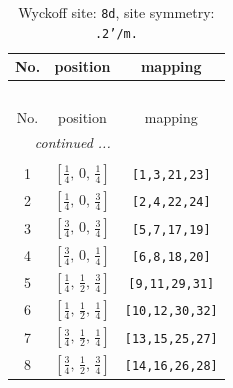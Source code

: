 \documentclass[fleqn,8pt]{jsarticle}
\begin{document}
\begin{longtable}{ccc}
\caption{Wyckoff site: {\tt 8d}, site symmetry: {\tt .2'/m.}}
 \\
 \hline \hline
No. & position & mapping \\ \hline \endfirsthead

\multicolumn{2}{l}{\tablename\ \thetable{}} \\
 \hline \hline
No. & position & mapping \\ \hline \endhead

 \hline \hline
\multicolumn{2}{r}{\footnotesize\it continued ...} \\ \endfoot

 \hline \hline
\multicolumn{2}{r}{} \\ \endlastfoot

1 & $\left[ \frac{1}{4},\, 0,\, \frac{1}{4} \right]$ & {\tt [1,3,21,23]} \\ \hline
2 & $\left[ \frac{1}{4},\, 0,\, \frac{3}{4} \right]$ & {\tt [2,4,22,24]} \\ \hline
3 & $\left[ \frac{3}{4},\, 0,\, \frac{3}{4} \right]$ & {\tt [5,7,17,19]} \\ \hline
4 & $\left[ \frac{3}{4},\, 0,\, \frac{1}{4} \right]$ & {\tt [6,8,18,20]} \\ \hline
5 & $\left[ \frac{1}{4},\, \frac{1}{2},\, \frac{3}{4} \right]$ & {\tt [9,11,29,31]} \\ \hline
6 & $\left[ \frac{1}{4},\, \frac{1}{2},\, \frac{1}{4} \right]$ & {\tt [10,12,30,32]} \\ \hline
7 & $\left[ \frac{3}{4},\, \frac{1}{2},\, \frac{1}{4} \right]$ & {\tt [13,15,25,27]} \\ \hline
8 & $\left[ \frac{3}{4},\, \frac{1}{2},\, \frac{3}{4} \right]$ & {\tt [14,16,26,28]} \\
\end{longtable}
\renewcommand{\arraystretch}{1.2}
\end{document}
